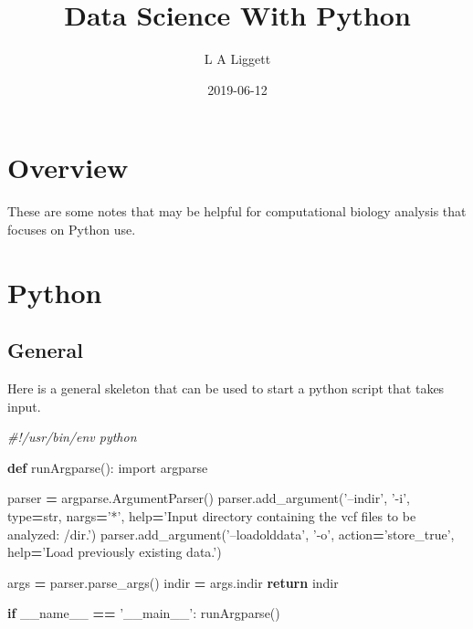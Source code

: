 \documentclass[]{book}
\title{Data Science With Python}
\author{L A Liggett}
\date{2019-06-12}
\newenvironment{Shaded}{\begin{snugshade}}{\end{snugshade}}
\newcommand{\KeywordTok}[1]{\textcolor[rgb]{0.13,0.29,0.53}{\textbf{#1}}}
\newcommand{\StringTok}[1]{\textcolor[rgb]{0.31,0.60,0.02}{#1}}
\newcommand{\ImportTok}[1]{#1}
\newcommand{\CommentTok}[1]{\textcolor[rgb]{0.56,0.35,0.01}{\textit{#1}}}
\newcommand{\VariableTok}[1]{\textcolor[rgb]{0.00,0.00,0.00}{#1}}
\newcommand{\ControlFlowTok}[1]{\textcolor[rgb]{0.13,0.29,0.53}{\textbf{#1}}}
\newcommand{\OperatorTok}[1]{\textcolor[rgb]{0.81,0.36,0.00}{\textbf{#1}}}
\newcommand{\BuiltInTok}[1]{#1}
\newcommand{\NormalTok}[1]{#1}
\begin{document}
\maketitle

{
\setcounter{tocdepth}{1}
\tableofcontents
}
\chapter{Overview}\label{overview}

These are some notes that may be helpful for computational biology
analysis that focuses on Python use.

\chapter{Python}\label{python}

\section{General}\label{general}

Here is a general skeleton that can be used to start a python script
that takes input.

\begin{Shaded}
\begin{Highlighting}[]
\CommentTok{#!/usr/bin/env python}

\KeywordTok{def}\NormalTok{ runArgparse():}
\ImportTok{import}\NormalTok{ argparse}

\NormalTok{parser }\OperatorTok{=}\NormalTok{ argparse.ArgumentParser()}
\NormalTok{parser.add_argument(}\StringTok{'--indir'}\NormalTok{, }\StringTok{'-i'}\NormalTok{, }\BuiltInTok{type}\OperatorTok{=}\BuiltInTok{str}\NormalTok{, nargs}\OperatorTok{=}\StringTok{'*'}\NormalTok{, }\BuiltInTok{help}\OperatorTok{=}\StringTok{'Input directory containing the vcf files to be analyzed: /dir.'}\NormalTok{)}
\NormalTok{parser.add_argument(}\StringTok{'--loadolddata'}\NormalTok{, }\StringTok{'-o'}\NormalTok{, action}\OperatorTok{=}\StringTok{'store_true'}\NormalTok{, }\BuiltInTok{help}\OperatorTok{=}\StringTok{'Load previously existing data.'}\NormalTok{)}

\NormalTok{args }\OperatorTok{=}\NormalTok{ parser.parse_args()}
\NormalTok{indir }\OperatorTok{=}\NormalTok{ args.indir}
\ControlFlowTok{return}\NormalTok{ indir}

\ControlFlowTok{if} \VariableTok{__name__} \OperatorTok{==} \StringTok{'__main__'}\NormalTok{:}
\NormalTok{    runArgparse()}
\end{Highlighting}
\end{Shaded}
\end{document}
